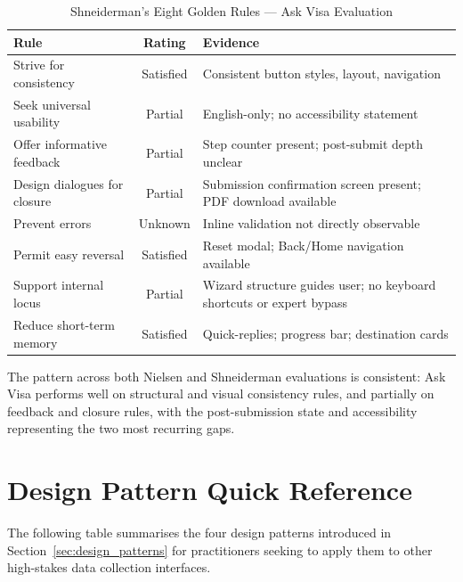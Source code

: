 \documentclass[journal, 10pt, twoside]{IEEEtran}
\begin{document}
\begin{table}[ht]
  \centering
  \caption{Shneiderman's Eight Golden Rules — Ask Visa Evaluation}
  \label{tab:shneiderman}
  \begin{tabular}{@{}p{3.2cm} c p{3.0cm}@{}}
    \toprule
    \textbf{Rule} & \textbf{Rating} & \textbf{Evidence} \\
    \midrule
    Strive for consistency     & Satisfied & Consistent button styles,
                                             layout, navigation \\
    Seek universal usability   & Partial   & English-only; no
                                             accessibility statement \\
    Offer informative feedback & Partial   & Step counter present;
                                             post-submit depth unclear \\
    Design dialogues for closure & Partial & Submission confirmation
                                             screen present; PDF
                                             download available \\
    Prevent errors             & Unknown   & Inline validation not
                                             directly observable \\
    Permit easy reversal       & Satisfied & Reset modal; Back/Home
                                             navigation available \\
    Support internal locus     & Partial   & Wizard structure guides
                                             user; no keyboard shortcuts
                                             or expert bypass \\
    Reduce short-term memory   & Satisfied & Quick-replies; progress
                                             bar; destination cards \\
    \bottomrule
  \end{tabular}
\end{table}

The pattern across both Nielsen and Shneiderman evaluations is consistent:
Ask Visa performs well on structural and visual consistency rules, and
partially on feedback and closure rules, with the post-submission state
and accessibility representing the two most recurring gaps.

\section{Design Pattern Quick Reference}
\label{app:patterns}
The following table summarises the four design patterns introduced in
Section~\ref{sec:design_patterns} for practitioners seeking to apply them
to other high-stakes data collection interfaces.
\end{document}
